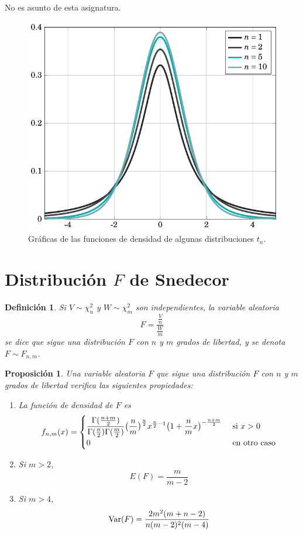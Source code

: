\documentclass[11pt]{report}
\makeatletter
\renewenvironment{proof}[1][\proofname]{\par
  \pushQED{\qed}%
  \normalfont \topsep\z@skip %
  \trivlist
  \item[\hskip\labelsep
        \itshape
    #1\@addpunct{.}]\ignorespaces
}{%
  \popQED\endtrivlist\@endpefalse
}
\newtheorem{proposition}{Proposición}
\newtheorem{definition}{Definición}
\theoremstyle{definition}
\makeatother
\begin{document}
\begin{proof}
    No es asunto de esta asignatura.
\end{proof}

\begin{figure}[H]
    \centering
    \includegraphics{ie_plot_student.pdf}
    \caption{Gráficas de las funciones de densidad de algunas distribuciones $t_n$.}
\end{figure}

\section{Distribución \texorpdfstring{$F$}{TEXT} de Snedecor}

\begin{definition}
Si $V \sim \chi^2_n$ y $W \sim \chi^2_m$ son independientes, la variable aleatoria
\[F = \frac{\frac{V}{n}}{\frac{W}{m}}\]
se dice que sigue una \emph{distribución $F$ con $n$ y $m$ grados de libertad}, y se denota $F \sim F_{n,m}$.
\end{definition}

\begin{proposition}
Una variable aleatoria $F$ que sigue una distribución $F$ con $n$ y $m$ grados de libertad verifica las siguientes propiedades:
\begin{enumerate}
\item La función de densidad de $F$ es
\[f_{n,m}(x) = \begin{cases}
    \displaystyle \frac{\Gamma(\frac{n+m}{2})}{\Gamma(\frac{n}{2})\Gamma(\frac{m}{2})}\bigl(\frac{n}{m}\bigr)^{\frac{n}{2}}x^{\frac{n}{2}-1}\bigl(1+\frac{n}{m}x\bigr)^{-\frac{n+m}{2}} & $ si $ x >0 \\
    0 & $ en otro caso$
\end{cases}
\]
\item Si $m>2$,
\[E(F)=\frac{m}{m-2}\]
\item Si $m>4$,
\[\textup{Var}(F) = \frac{2m^2(m+n-2)}{n(m-2)^2(m-4)}\]
\end{enumerate}
\end{proposition}
\end{document}
